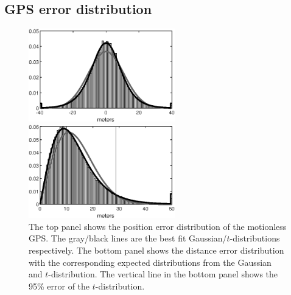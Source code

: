 \documentclass{ametsoc}
\begin{document}

%
\subsection{GPS error distribution}
\label{gps_position_errors}
%

\begin{figure}
  \centerline{\includegraphics[width=15pc,angle=0]{gps_error_distribution.eps}}
  \centerline{\includegraphics[width=15pc,angle=0]{gps_distance_error_distribution.eps}} 
  \caption{The top panel shows the position error distribution of the motionless GPS. The gray/black lines are the best fit Gaussian/$t$-distributions respectively. The bottom panel shows the distance error distribution with the corresponding expected distributions from the Gaussian and $t$-distribution. The vertical line in the bottom panel shows the 95\% error of the $t$-distribution.}
  \label{motionless_error}
\end{figure}
\end{document}
